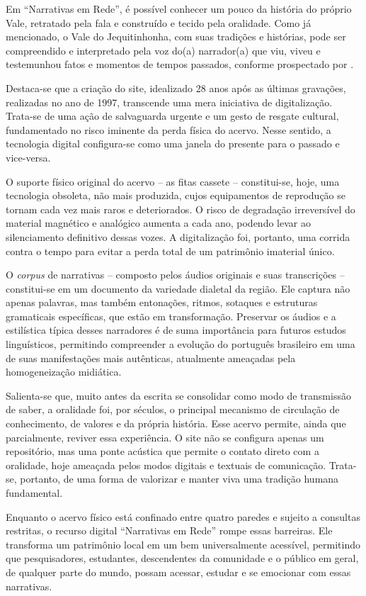 \documentclass[portuguese]{textolivre}
\begin{document}
Em “Narrativas em Rede”, é possível conhecer um pouco da história do próprio Vale, retratado pela fala e construído e tecido pela oralidade. Como já mencionado, o Vale do Jequitinhonha, com suas tradições e histórias, pode ser compreendido e interpretado pela voz do(a) narrador(a) que viu, viveu e testemunhou fatos e momentos de tempos passados, conforme prospectado por \textcite{Benjamin1985}.

Destaca-se que a criação do site, idealizado 28 anos após as últimas gravações, realizadas no ano de 1997, transcende uma mera iniciativa de digitalização. Trata-se de uma ação de salvaguarda urgente e um gesto de resgate cultural, fundamentado no risco iminente da perda física do acervo. Nesse sentido, a tecnologia digital configura-se como uma janela do presente para o passado e vice-versa.	

O suporte físico original do acervo – as fitas cassete – constitui-se, hoje, uma tecnologia obsoleta, não mais produzida, cujos equipamentos de reprodução se tornam cada vez mais raros e deteriorados. O risco de degradação irreversível do material magnético e analógico aumenta a cada ano, podendo levar ao silenciamento definitivo dessas vozes. A digitalização foi, portanto, uma corrida contra o tempo para evitar a perda total de um patrimônio imaterial único.

O \textit{corpus} de narrativas – composto pelos áudios originais e suas transcrições – constitui-se em um documento da variedade dialetal da região. Ele captura não apenas palavras, mas também entonações, ritmos, sotaques e estruturas gramaticais específicas, que estão em transformação. Preservar os áudios e a estilística típica desses narradores é de suma importância para futuros estudos linguísticos, permitindo compreender a evolução do português brasileiro em uma de suas manifestações mais autênticas, atualmente ameaçadas pela homogeneização midiática.

Salienta-se que, muito antes da escrita se consolidar como modo de transmissão de saber, a oralidade foi, por séculos, o principal mecanismo de circulação de conhecimento, de valores e da própria história. Esse acervo permite, ainda que parcialmente, reviver essa experiência. O site não se configura apenas um repositório, mas uma ponte acústica que permite o contato direto com a oralidade, hoje ameaçada pelos modos digitais e textuais de comunicação. Trata-se, portanto, de uma forma de valorizar e manter viva uma tradição humana fundamental.

Enquanto o acervo físico está confinado entre quatro paredes e sujeito a consultas restritas, o recurso digital “Narrativas em Rede” rompe essas barreiras. Ele transforma um patrimônio local em um bem universalmente acessível, permitindo que pesquisadores, estudantes, descendentes da comunidade e o público em geral, de qualquer parte do mundo, possam acessar, estudar e se emocionar com essas narrativas.
\end{document}

